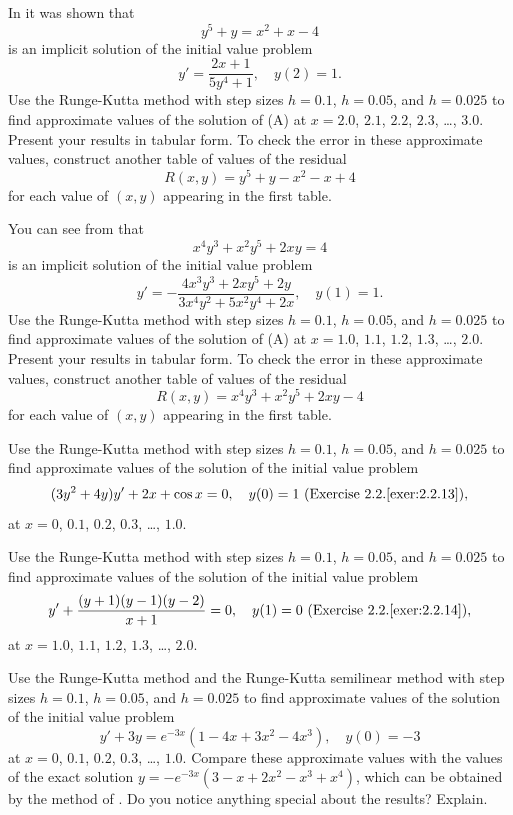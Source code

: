 \begin{exerciselist}
\item\label{exer:3.3.9}\Cex
In  it was shown that
\[
y^5+y=x^2+x-4
\]
is an implicit solution of  the initial value problem
\[
y'=\frac{2x+1}{5y^4+1},\quad y(2)=1.\tag{A}
\]
Use the Runge-Kutta method with step sizes $h=0.1$, $h=0.05$, and
$h=0.025$ to find approximate values of the solution of (A) at
$x=2.0$, $2.1$, $2.2$, $2.3$, \dots, $3.0$. Present your results in tabular
form.
To check the error in these approximate values, construct another
table of values of the residual
\[
  R(x,y)=y^5+y-x^2-x+4
\]
for each value of $(x,y)$ appearing in the first table.

\item\label{exer:3.3.10}\Cex
You can see from  that
\[
x^4y^3+x^2y^5+2xy=4
\]
is an implicit solution of  the initial value problem
\[
y'=-\frac{4x^3y^3+2xy^5+2y}{3x^4y^2+5x^2y^4+2x},\quad y(1)=1.\tag{A}
\]
Use the Runge-Kutta method with step sizes $h=0.1$, $h=0.05$, and
$h=0.025$ to find approximate values of the solution of (A) at
$x=1.0$, $1.1$, $1.2$, $1.3$, \dots, $2.0$. Present your results in tabular
form.
To check the error in these approximate values, construct another
table of values of the residual
\[
R(x,y)=x^4y^3+x^2y^5+2xy-4
\]
for each value of $(x,y)$ appearing in the first table.

\item\label{exer:3.3.11}\Cex
Use the Runge-Kutta method with step sizes $h=0.1$, $h=0.05$, and
$h=0.025$ to find approximate values of the solution of the initial
value problem
\[
(3y^2+4y)y'+2x+\cos x=0, \quad y(0)=1
\text{ (Exercise~2.2.\ref{exer:2.2.13})},
\]
at $x=0$, $0.1$, $0.2$, $0.3$, \dots, $1.0$.

\item\label{exer:3.3.12}\Cex
Use the Runge-Kutta method with step sizes $h=0.1$, $h=0.05$, and
$h=0.025$ to find approximate values of the solution of the initial
value problem
\[
y'+\frac{(y+1)(y-1)(y-2)}{x+1}=0, \quad y(1)=0
\text{ (Exercise~2.2.\ref{exer:2.2.14})},
\]
at $x=1.0$, $1.1$, $1.2$, $1.3$, \dots, $2.0$.

\item\label{exer:3.3.13}\Cex
Use the Runge-Kutta method and the Runge-Kutta  semilinear method
with step sizes
$h=0.1$, $h=0.05$, and $h=0.025$ to find approximate values of the
solution of the initial value problem
\[
y'+3y=e^{-3x}(1-4x+3x^2-4x^3),\quad y(0)=-3
\]
at $x=0$, $0.1$, $0.2$, $0.3$, \dots, $1.0$. Compare these approximate
values with
the values of the exact solution $y=-e^{-3x}(3-x+2x^2-x^3+x^4)$, which
can be obtained by the method of . Do
you notice anything special about the results? Explain.


\end{exerciselist}

